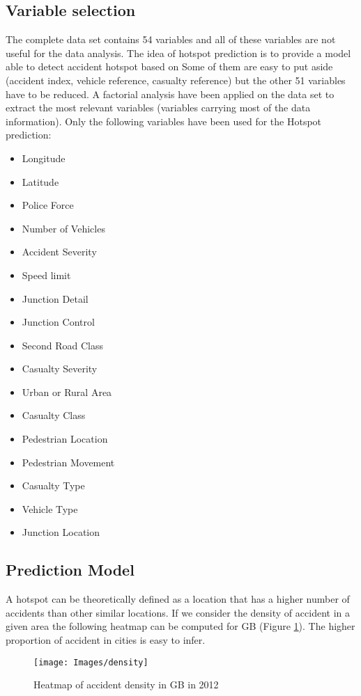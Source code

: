 \documentclass{article}
\begin{document}
\subsection{Variable selection} 

The complete data set contains 54 variables and all of these variables are not useful for the data analysis. 
The idea of hotspot prediction is to provide a model able to detect accident hotspot based on 
Some of them are easy to put aside (accident index, vehicle reference, casualty reference) but the other 51 variables have to be reduced. 
A factorial analysis have been applied on the data set to extract the most relevant variables (variables carrying most of the data information).
Only the following variables have been used for the Hotspot prediction:
\begin{itemize}
\item Longitude
\item Latitude
\item Police Force
\item Number of Vehicles
\item Accident Severity
\item Speed limit
\item Junction Detail
\item Junction Control
\item Second Road Class
\item Casualty Severity
\item Urban or Rural Area
\item Casualty Class
\item Pedestrian Location
\item Pedestrian Movement
\item Casualty Type
\item Vehicle Type
\item Junction Location
\end{itemize}



\subsection{Prediction Model}
A hotspot can be theoretically defined as a location that has a higher number of accidents than other similar locations. If we consider the density of accident in a given area the following heatmap can be computed for GB (Figure \ref{fig:density_2012}). The higher proportion of accident in cities is easy to infer. 

 \begin{figure}[H]
  \centering
  \texttt{[image: Images/density]}
  \caption{Heatmap of accident density in GB in 2012 }
  \label{fig:density_2012}
\end{figure} 
\end{document}
